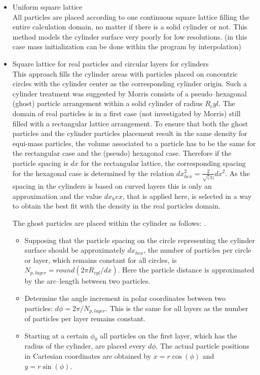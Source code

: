 \documentclass{report}
\begin{document}
\begin{itemize}

 \item Uniform square lattice\\
  All particles are placed according to one continuous square lattice filling the entire calculation domain, no matter if there is a solid cylinder or not. This method
  models the cylinder surface very poorly for low resolutions.
(in this case mass initialization can be done within the program by interpolation)

\item Square lattice for real particles and circular layers for cylinders\\
This approach fills the cylinder areas with particles placed on concentric circles with the cylinder center as the corresponding cylinder origin.
Such a cylinder treatment was suggested by Morris \cite{Zhu1999} consists of a pseudo--hexagonal (ghost) particle arrangement within a solid cylinder of radius $R_cyl$. The domain of real particles is in a first case (not investigated by Morris) still filled with a rectangular lattice arrangement. To ensure that both the ghost particles and the cylinder particles placement result in the same density for equi-mass particles, the volume associated to a particle has to be the same for the rectangular case and the (pseudo) hexagonal case. Therefore if the particle spacing is $dx$ for the rectangular lattice, the corresponding spacing for the hexagonal case is determined by the relation $dx_\mathit{hex}^2=\frac{2}{\sqrt(3)}dx^2$. As the spacing in the cylinders is based on curved layers this is only an approximation and the value $dx_hex$, that is applied here, is selected in a way to obtain the best fit with the density in the real particles domain.

 The ghost particles are placed within the cylinder as follows:  .
  \begin{itemize}

   \item Supposing that the particle spacing on the circle representing the cylinder surface should be approximately $dx_\mathit{hex}$, the number of particles per circle or layer, which remains constant for all circles, is $N_{p,\mathit{layer}}={\mathit round}(2\pi R_\mathit{cyl}/dx)$. Here the particle distance is approximated by the arc--length between two particles.

\item Determine the angle increment in polar coordinates between two particles:
  $d\phi=2\pi/N_{p,\mathit{layer}}$. This is the same for all layers as the number of particles per layer remains constant. 
 \item Starting at a certain $\phi_0$ all particles on the first layer, which has the radius of the cylinder, are placed every $d\phi$. The actual particle positions in Cartesian coordinates are obtained by $x=r \cos(\phi)$ and $y=r \sin(\phi)$.


\end{itemize}
\end{itemize}
\end{document}

